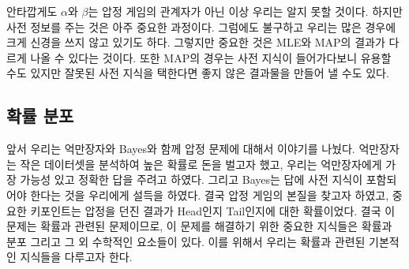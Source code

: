 \documentclass[a4paper]{oblivoir}
\begin{document}
\indent 안타깝게도 $\alpha$와 $\beta$는 압정 게임의 관계자가 아닌 이상 우리는 알지 못할 것이다. 하지만 사전 정보를 주는 것은 아주 중요한 과정이다. 그럼에도 불구하고 우리는 많은 경우에 크게 신경을 쓰지 않고 있기도 하다. 그렇지만 중요한 것은 MLE와 MAP의 결과가 다르게 나올 수 있다는 것이다. 또한 MAP의 경우는 사전 지식이 들어가다보니 유용할 수도 있지만 잘못된 사전 지식을 택한다면 좋지 않은 결과물을 만들어 낼 수도 있다.\\

\subsection{확률 분포}
\indent 앞서 우리는 억만장자와 Bayes와 함께 압정 문제에 대해서 이야기를 나눴다.  억만장자는 작은 데이터셋을 분석하여 높은 확률로 돈을 벌고자 했고, 우리는 억만장자에게 가장 가능성 있고 정확한 답을 주려고 하였다. 그리고 Bayes는 답에 사전 지식이 포함되어야 한다는 것을 우리에게 설득을 하였다. 
\indent 결국 압정 게임의 본질을 찾고자 하였고, 중요한 키포인트는 압정을 던진 결과가 Head인지 Tail인지에 대한 확률이었다. 결국 이 문제는 확률과 관련된 문제이므로, 이 문제를 해결하기 위한 중요한 지식들은 확률과 분포 그리고 그 외 수학적인 요소들이 있다. 이를 위해서 우리는 확률과 관련된 기본적인 지식들을 다루고자 한다.\\

\end{document}
